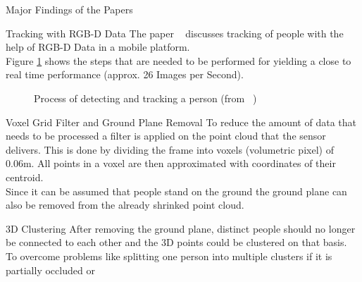 \documentclass[a4paper,oneside,10pt,DIV12,headsepline,footexclude,headexclude]{scrartcl}
\begin{document}
\begin{section}{Major Findings of the Papers}
\begin{subsection}{Tracking with RGB-D Data}
The paper ~\cite{munaro2012tracking} discusses tracking of people with the help
of RGB-D Data in a mobile platform.\\
Figure \ref{fig:processSteps} shows the steps that are needed to be performed for
yielding a close to real time performance (approx. 26 Images per Second).
\begin{figure}[h]
\centering
{}
\caption{Process of detecting and tracking a person (from ~\cite{munaro2012tracking}) }
\label{fig:processSteps}
\end{figure}
\begin{subsubsection}{Voxel Grid Filter and Ground Plane Removal}
To reduce the amount of data that needs to be processed a filter is applied on
the point cloud that the sensor delivers. This is done by dividing the frame
into voxels (volumetric pixel) of 0.06m. All points in a voxel are then approximated
with coordinates of their centroid.\\
Since it can be assumed that people stand on the ground the ground plane can also
be removed from the already shrinked point cloud.
\end{subsubsection}
\begin{subsubsection}{3D Clustering}
After removing the ground plane, distinct people should no longer be connected to
each other and the 3D points could be clustered on that basis. To overcome problems
like splitting one person into multiple clusters if it is partially occluded or 

\end{subsubsection}
\end{subsection}
\end{section}
\end{document}
